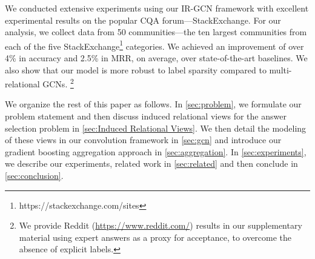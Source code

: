 We conducted extensive experiments using our IR-GCN framework with excellent experimental results on the popular CQA forum---StackExchange. For our analysis, we collect data from 50 communities---the ten largest communities from each of the five StackExchange\footnote{https://stackexchange.com/sites} categories. We achieved an improvement of over 4\% in accuracy and 2.5\% in MRR, on average, over state-of-the-art baselines. We also show that our model is more robust to label sparsity compared to multi-relational GCNs. %
\footnote{We provide Reddit (\url{https://www.reddit.com/}) results in our supplementary material using expert answers as a proxy for acceptance, to overcome the absence of explicit labels.}

We organize the rest of this paper as follows. In \cref{sec:problem}, we formulate our problem statement and then discuss induced relational views for the answer selection problem in \cref{sec:Induced Relational Views}. We then detail the modeling of these views in our convolution framework in \cref{sec:gcn} and introduce our gradient boosting aggregation approach in \cref{sec:aggregation}. In \cref{sec:experiments}, we describe our experiments, related work in \cref{sec:related} and then conclude in \cref{sec:conclusion}.
